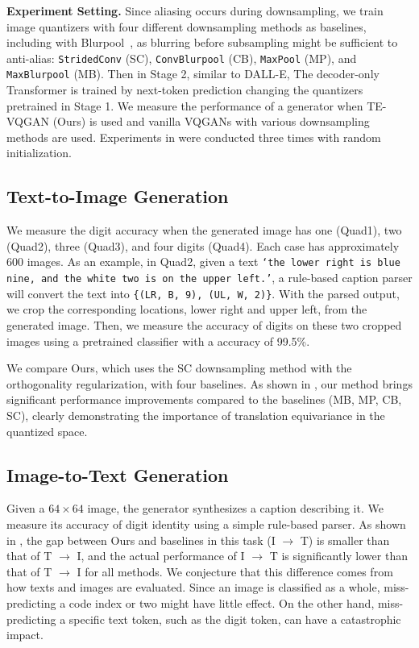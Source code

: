 \documentclass{article}
\newcommand{\wcedit}[1]{\textcolor{blue}{\emph{[Shin: #1]}}}
\begin{document}
\noindent \textbf{Experiment Setting.}
Since aliasing occurs during downsampling, we train image quantizers with four different downsampling methods as baselines, including with Blurpool~\cite{zhang2019making}, as blurring before subsampling might be sufficient to anti-alias:
\texttt{StridedConv} (SC), \texttt{ConvBlurpool} (CB), \texttt{MaxPool} (MP), and \texttt{MaxBlurpool} (MB).
Then in Stage 2, similar to DALL-E, The decoder-only Transformer is trained by next-token prediction changing the quantizers pretrained in Stage 1. 
We measure the performance of a generator when TE-VQGAN (Ours) is used and vanilla VQGANs with various downsampling methods are used.
Experiments in  were conducted three times with random initialization.




\subsection{Text-to-Image Generation}
We measure the digit accuracy when the generated image has one (Quad1), two (Quad2), three (Quad3), and four digits (Quad4).
Each case has approximately 600 images.
As an example, in Quad2, given a text \texttt{`the lower right is blue nine, and the white two is on the upper left.'}, a rule-based caption parser will convert the text into \texttt{\{(LR, B, 9), (UL, W, 2)\}}.
With the parsed output, we crop the corresponding locations, lower right and upper left, from the generated image.
Then, we measure the accuracy of digits on these two cropped images using a pretrained classifier with a accuracy of 99.5\%.

We compare Ours, which uses the SC downsampling method with the orthogonality regularization, with four baselines.
As shown in , our method brings significant performance improvements compared to the baselines (MB, MP, CB, SC), clearly demonstrating the importance of translation equivariance in the quantized space.

\vspace{-2mm}
\subsection{Image-to-Text Generation}

Given a $64 \times 64$ image, the generator synthesizes a caption describing it. We measure its accuracy of digit identity using a simple rule-based parser.
As shown in , the gap between Ours and baselines in this task (I $\to$ T) is smaller than that of T $\to$ I, and the actual performance of I $\to$ T is significantly lower than that of T $\to$ I for all methods.
We conjecture that this difference comes from how texts and images are evaluated.
Since an image is classified as a whole, miss-predicting a code index or two might have little effect.
On the other hand, miss-predicting a specific text token, such as the digit token, can have a catastrophic impact.
\end{document}
